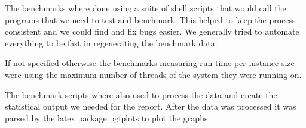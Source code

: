 The benchmarks where done using a suite of shell scripts that would call the programs that we need to test and benchmark.
This helped to keep the process consistent and we could find and fix bugs easier.
We generally tried to automate everything to be fast in regenerating the benchmark data.

If not specified otherwise the benchmarks measuring run time per instance size were using the maximum number of threads of the system they were running on.

The benchmark scripts where also used to process the data and create the statistical output we needed for the report.
After the data was processed it was parsed by the latex package pgfplots to plot the graphs.
